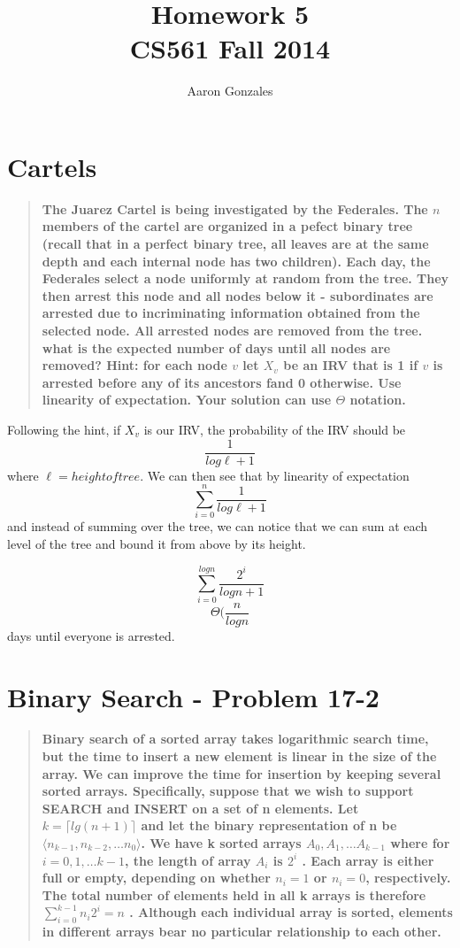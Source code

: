\documentclass[titlepage]{article}\usepackage[]{graphicx}\usepackage[]{color}
\begin{document}
\title{Homework 5 \\ CS561 Fall 2014}
\author{Aaron Gonzales}
\maketitle


\section{Cartels}
\begin{quote}
  \textbf{The Juarez Cartel is being investigated by the Federales. The $n$
  members of the cartel are organized in a pefect binary tree (recall that in a
perfect binary tree, all leaves are at the same depth and each internal node
has two children). Each day, the Federales select a node uniformly at random
from the tree. They then arrest this node and all nodes below it - subordinates
are arrested due to incriminating information obtained from the selected node.
All arrested nodes are removed from the tree. \\ what is the expected number of
days until all nodes are removed? Hint: for each node $v$ let $X_v$ be an IRV
that is 1 if $v$ is arrested before any of its ancestors fand 0 otherwise. Use
linearity of expectation. Your solution can use $\Theta$ notation. }
\end{quote}
Following the hint, if $X_v$ is our IRV, the probability of the IRV should be
\[ \frac{1}{log \ell +1} \] where $\ell = height of tree$. We can then see that
by linearity of expectation 
\[ \sum_{i=0}^n \frac{1}{log \ell +1} \] and instead of summing over the tree,
we can notice that we can sum at each level of the tree and bound it from above
by its height.

\[ \sum_{i=0}^{log n} \frac{2^i}{log n +1} \]
\[ \Theta(\frac{n}{log n}\] days until everyone is arrested. 



\section{Binary Search - Problem 17-2}
\begin{quote}
  \textbf{
	Binary search of a sorted array takes logarithmic search time, but the time
	to insert a new element is linear in the size of the array. We can improve
	the time for insertion by keeping several sorted arrays.  Specifically,
	suppose that we wish to support SEARCH and INSERT on a set of n elements.
	Let $k =  \lceil lg(n+1)\rceil $ and let the binary representation of n be
	$ \langle n_{ k-1 }, n_{k-2},\dots n_0 \rangle$.  We have k sorted arrays $
	A_0, A_1, \dots A_{k-1}$ where for $ i = 0, 1, \dots k-1$, the length of
	array $A_i$  is $2^i$ .  Each array is either full or empty, depending on
	whether $n_i = 1 $ or $n_i = 0$, respectively. The total number of elements
	held in all k arrays is therefore $\sum_{i = 0}^{k -1 } n_i 2^i = n $ .
	Although each individual array is sorted, elements in different arrays bear
	no particular relationship to each other.}
\end{quote}
\end{document}
